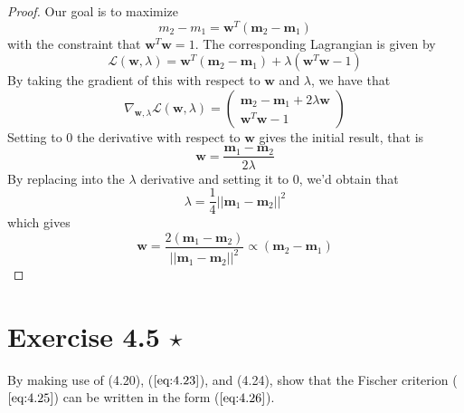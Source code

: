 \begin{proof}
    Our goal is to maximize
    \begin{equation*}
        m_2 - m_1 = \mathbf{w}^T(\mathbf{m}_2 - \mathbf{m}_1)
        \tag{3.24}\label{eq:3.24}
    \end{equation*}
    with the constraint that $\mathbf{w}^T\mathbf{w} = 1$.
    The corresponding Lagrangian is given by
    \[
        \mathcal{L}(\mathbf{w}, \lambda) 
        = \mathbf{w}^T(\mathbf{m}_2 - \mathbf{m}_1) + \lambda(\mathbf{w}^T\mathbf{w} - 1)
    \] 
    By taking the gradient of this with respect to $\mathbf{w}$ and $\lambda$,
    we have that
    \[
        \nabla_{\mathbf{w}, \lambda} \mathcal{L}(\mathbf{w}, \lambda) 
        = \begin{pmatrix}
            \mathbf{m}_2 - \mathbf{m}_1 + 2\lambda\mathbf{w} \\
            \mathbf{w}^T\mathbf{w} - 1
        \end{pmatrix}
    \] 
    Setting to 0 the derivative with respect to $\mathbf{w}$ gives the initial result, that is
    \[
        \mathbf{w} = \frac{\mathbf{m}_1 - \mathbf{m}_2}{2\lambda} 
    \] 
    By replacing into the $\lambda$ derivative and setting it to 0, we'd obtain that
     \[
         \lambda = \frac{1}{4} ||\mathbf{m}_1 - \mathbf{m}_2||^2
    \] 
    which gives
    \[
        \mathbf{w} = \frac{2(\mathbf{m}_1 - \mathbf{m}_2)}{||\mathbf{m}_1 - \mathbf{m}_2||^2}
        \propto (\mathbf{m}_2 - \mathbf{m}_1)
    \] 
\end{proof}

\section*{Exercise 4.5 $\star$}
By making use of (4.20), ($\ref{eq:4.23}$), and (4.24), show that the Fischer 
criterion ($\ref{eq:4.25}$) can be written in the form ($\ref{eq:4.26}$).

\vspace{1em}

